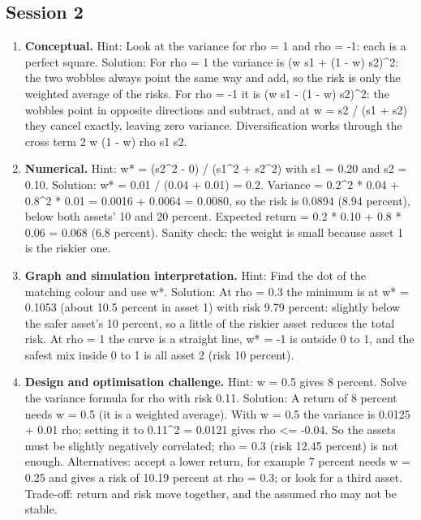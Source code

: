 \documentclass[11pt,a4paper]{article}
\begin{document}
\subsection*{Session 2}
\begin{enumerate}[nosep]
\item \textbf{Conceptual.} Hint: Look at the variance for rho = 1 and rho = -1: each is a perfect square. Solution: For rho = 1 the variance is (w s1 + (1 - w) s2)\textasciicircum{}2: the two wobbles always point the same way and add, so the risk is only the weighted average of the risks. For rho = -1 it is (w s1 - (1 - w) s2)\textasciicircum{}2: the wobbles point in opposite directions and subtract, and at w = s2 / (s1 + s2) they cancel exactly, leaving zero variance. Diversification works through the cross term 2 w (1 - w) rho s1 s2.
\item \textbf{Numerical.} Hint: w* = (s2\textasciicircum{}2 - 0) / (s1\textasciicircum{}2 + s2\textasciicircum{}2) with s1 = 0.20 and s2 = 0.10. Solution: w* = 0.01 / (0.04 + 0.01) = 0.2. Variance = 0.2\textasciicircum{}2 * 0.04 + 0.8\textasciicircum{}2 * 0.01 = 0.0016 + 0.0064 = 0.0080, so the risk is 0.0894 (8.94 percent), below both assets' 10 and 20 percent. Expected return = 0.2 * 0.10 + 0.8 * 0.06 = 0.068 (6.8 percent). Sanity check: the weight is small because asset 1 is the riskier one.
\item \textbf{Graph and simulation interpretation.} Hint: Find the dot of the matching colour and use w*. Solution: At rho = 0.3 the minimum is at w* = 0.1053 (about 10.5 percent in asset 1) with risk 9.79 percent: slightly below the safer asset's 10 percent, so a little of the riskier asset reduces the total risk. At rho = 1 the curve is a straight line, w* = -1 is outside 0 to 1, and the safest mix inside 0 to 1 is all asset 2 (risk 10 percent).
\item \textbf{Design and optimisation challenge.} Hint: w = 0.5 gives 8 percent. Solve the variance formula for rho with risk 0.11. Solution: A return of 8 percent needs w = 0.5 (it is a weighted average). With w = 0.5 the variance is 0.0125 + 0.01 rho; setting it to 0.11\textasciicircum{}2 = 0.0121 gives rho \textless{}= -0.04. So the assets must be slightly negatively correlated; rho = 0.3 (risk 12.45 percent) is not enough. Alternatives: accept a lower return, for example 7 percent needs w = 0.25 and gives a risk of 10.19 percent at rho = 0.3; or look for a third asset. Trade-off: return and risk move together, and the assumed rho may not be stable.
\end{enumerate}
\end{document}

